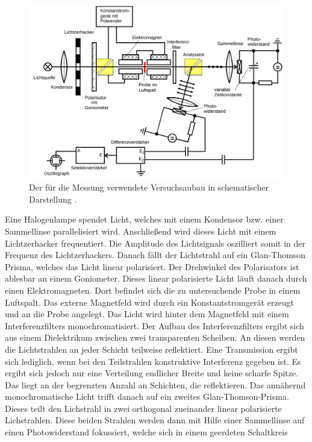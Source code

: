 \documentclass[
  bibliography=totoc,     %
  captions=tableheading,  %
  titlepage=firstiscover, %
]{scrartcl}
\begin{document}
\begin{figure}
  \centering
  \includegraphics[width=\textwidth]{images/aufbau.png}
  \caption{Der für die Messung verwendete Versuchsaubau in schematischer Darstellung \cite{anleitung}.}
  \label{fig:Aufbau}
\end{figure}
\noindent
Eine Halogenlampe spendet Licht, welches mit einem Kondensor bzw. einer Sammellinse parallelisiert
wird. Anschließend wird dieses Licht mit einem Lichtzerhacker frequentiert.
Die Amplitude des Lichtsignals oszilliert somit in der Frequenz des
Lichtzerhackers. Danach fällt der Lichtstrahl auf ein Glan-Thomson
Prisma, welches das Licht linear polarisiert.
Der Drehwinkel des Polarisators ist ablesbar an einem Goniometer.
Dieses linear polarisierte Licht läuft danach durch einen Elektromagneten.
Dort befindet sich die zu untersuchende Probe in einem Luftspalt.
Das externe Magnetfeld wird durch ein Konstantstromgerät erzeugt
und an die Probe angelegt.
Das Licht wird hinter dem Magnetfeld mit einem Interferenzfilters monochromatisiert.
Der Aufbau des Interferenzfilters ergibt sich aus einem Dielektrikum zwischen zwei
transparenten Scheiben. An diesen werden die Lichtstrahlen an jeder
Schicht teilweise reflektiert. Eine Transmission ergibt sich lediglich, wenn bei
den Teilstrahlen konstruktive Interferenz gegeben ist.
Es ergibt sich jedoch nur eine Verteilung endlicher Breite und keine scharfe Spitze.
Das liegt an der begrenzten Anzahl an Schichten, die reflektieren.
Das annähernd monochromatische Licht trifft danach auf ein zweites Glan-Thomson-Prisma.
Dieses teilt den Lichstrahl in zwei orthogonal zueinander linear polarisierte
Lichstrahlen. Diese beiden Strahlen werden dann mit Hilfe einer Sammellinse
auf einen Photowiderstand fokussiert, welche sich in einem geerdeten Schaltkreis
\end{document}
